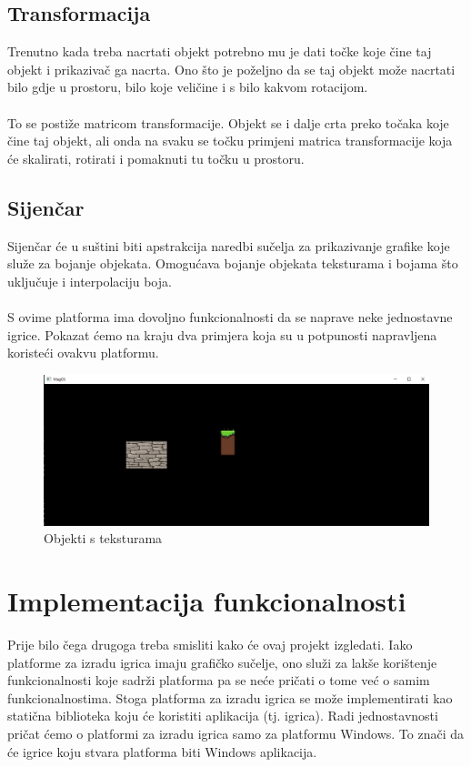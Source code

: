 \documentclass{mathos}
\begin{document}
\section{Transformacija}\label{ss_transformacija}
Trenutno kada treba nacrtati objekt potrebno mu je dati točke koje čine taj objekt i prikazivač ga nacrta. Ono što je poželjno da se taj objekt može nacrtati bilo gdje u
prostoru, bilo koje veličine i s bilo kakvom rotacijom.
\\ \\
To se postiže matricom transformacije. Objekt se i dalje crta preko točaka koje čine taj objekt, ali onda na svaku se točku primjeni matrica transformacije koja će skalirati,
rotirati i pomaknuti tu točku u prostoru.

\section{Sijenčar}\label{ss_sijenčar}
Sijenčar će u suštini biti apstrakcija naredbi sučelja za prikazivanje grafike koje služe za bojanje objekata. Omogućava bojanje objekata teksturama i bojama što uključuje i
interpolaciju boja.
\\ \\
S ovime platforma ima dovoljno funkcionalnosti da se naprave neke jednostavne igrice. Pokazat ćemo na kraju dva primjera koja su u potpunosti napravljena koristeći ovakvu
platformu.

\begin{figure}[H]
    \centering
    \includegraphics[scale=0.4]{Slike/textures.png}
    \caption{Objekti s teksturama}
    \label{im_tekstura}
\end{figure}

\chapter{Implementacija funkcionalnosti}
Prije bilo čega drugoga treba smisliti kako će ovaj projekt izgledati. Iako platforme za izradu igrica imaju grafičko sučelje, ono služi za lakše korištenje funkcionalnosti koje
sadrži platforma pa se neće pričati o tome već o samim funkcionalnostima. Stoga platforma za izradu igrica se može implementirati kao statična biblioteka koju će koristiti
aplikacija (tj. igrica). Radi jednostavnosti pričat ćemo o platformi za izradu igrica samo za platformu Windows.
To znači da će igrice koju stvara platforma biti Windows aplikacija.
\end{document}

